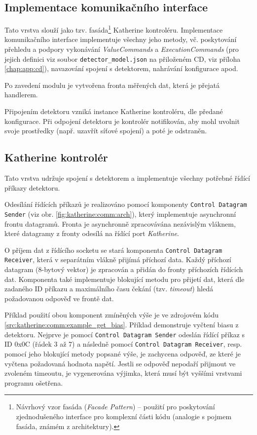 \subsection{Implementace komunikačního interface}
Tato vrstva slouží jako tzv. fasáda\footnote{Návrhový vzor fasáda (\textit{Facade Pattern}) -- použití pro poskytování zjednodušeného interface pro komplexní části kódu (analogie s pojmem fasáda, známém z architektury).} Katherine kontroléru. Implementace komunikačního interface implementuje všechny jeho metody, vč. poskytování přehledu a podpory vykonávání \textit{ValueCommands} a \textit{ExecutionCommands} (pro jejich definici viz soubor \texttt{detector\_model.json} na přiloženém CD, viz příloha \ref{chap:app:cd}), navazování spojení s detektorem, nahrávání konfigurace apod.

Po zavedení modulu je vytvořena fronta měřených dat, která je přejatá handlerem.

Připojením detektoru vzniká instance Katherine kontroléru, dle předané konfigurace. Při odpojení detektoru je kontrolér notifikován, aby mohl uvolnit svoje prostředky (např. uzavřít síťové spojení) a poté je odstraněn.

\subsection{Katherine kontrolér}
Tato vrstva udržuje spojení s detektorem a implementuje všechny potřebné řídící příkazy detektoru.

Odesílání řídících příkazů je realizováno pomocí komponenty \texttt{Control Datagram Sender} (viz obr. \ref{fig:katherine:comm:arch}), který implementuje asynchronní frontu datagramů. Fronta je asynchronně zpracovávána nezávislým vláknem, které datagramy z fronty odesílá na řídící port \textit{Katherine}.

O příjem dat z řídícího socketu se stará komponenta \texttt{Control Datagram Receiver}, která v separátním vlákně přijímá příchozí data. Každý příchozí datagram (8-bytový vektor) je zpracován a přidán do fronty příchozích řídících dat. Komponenta také implementuje blokující metodu pro přijetí dat, která dle zadaného ID příkazu a maximálního času čekání (tzv. \textit{timeout}) hledá požadovanou odpověď ve frontě dat.

Příklad použití obou komponent zmíněných výše je ve zdrojovém kódu \ref{src:katherine:comm:example_get_bias}. Příklad demonstruje vyčtení biasu z detektoru. Nejprve je pomocí \texttt{Control Datagram Sender} odeslán řídící příkaz s ID 0x0C (řádek 3 až 7) a následně pomocí \texttt{Control Datagram Receiver}, resp. pomocí jeho blokující metody popsané výše, je zachycena odpověď, ze které je vyčtena požadovaná hodnota napětí. Jestli se odpověď nepodaří přijmout ve zvoleném timeoutu, je vygenerována výjimka, která musí být vyššími vrstvami programu ošetřena.

